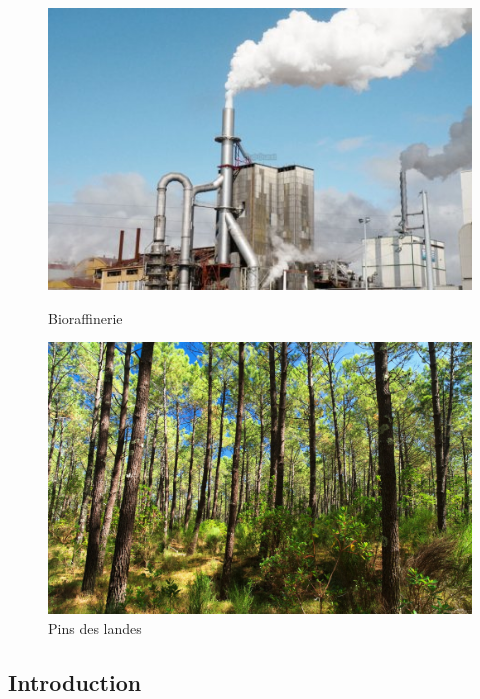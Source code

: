 \begin{figure}[htbp]
\begin{minipage}{0.43\linewidth}
\begin{center}
\includegraphics[width=\linewidth]{img/tartas.jpg}
\caption{Bioraffinerie}
\label{fig:tartas1}
\end{center}
\end{minipage}
\hfill
\begin{minipage}{0.46\linewidth}
\includegraphics[width=\linewidth]{img/Pins.jpg}
\caption{Pins des landes}
\label{fig:tartas2}
\end{minipage}
\end{figure}

\subsection{Introduction}

